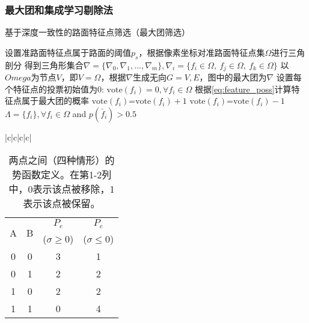 \subsubsection{最大团和集成学习剔除法}
\begin{algorithm}
    \caption{基于深度一致性的路面特征点筛选（最大团筛选）}
    设置准路面特征点属于路面的阈值$p_s$，根据像素坐标对准路面特征点集$\Omega$进行三角剖分
    得到三角形集合$\nabla =\{\nabla_0,\nabla_1,...,\nabla_m\}, \nabla_{i}=\{f_i\in\Omega,\ f_j\in\Omega,\ f_k\in\Omega\}$
    以$Omega$为节点$V$，即$V=\Omega$，根据$\nabla$生成无向$G={V, E}$，图中的最大团为$\nabla$ 
    {设置每个特征点的投票初始值为0: $\text{vote}(f_i)=0, \forall f_i \in \Omega$
        {根据\eqref{eq:feature_poss}计算特征点属于最大团的概率
              {$\text{vote}(f_i)$=$\text{vote}(f_i)+1$}
            \Else
              {$\text{vote}(f_i)$=$\text{vote}(f_i)-1$}
        } 
    $\Lambda = \{f_i\}, \forall f_i \in \Omega$ and $p(\check{f_i})>0.5$
    }
    \label{alg:depth_selection_4}
\end{algorithm}
\begin{table}{|c|c|c|c|}
    \caption{两点之间（四种情形）的势函数定义。在第1-2列中，0表示该点被移除，1表示该点被保留。}
    \label{tab:max_clique}
    \centering
    \begin{tabular}{c c c c}
    \toprule
    \multirow{2}{*}{A} & \multirow{2}{*}{B}  &$P_e$&$P_e$ \\
     &&($\sigma\ge0$)&($\sigma\leq0$)\\
    \midrule
   0&0&3&1\\
   0&1&2&2\\
   1&0&2&2\\
   1&1&0&4\\
   \bottomrule
   \end{tabular} 
   \label{tab:Pe}
 \end{table}
